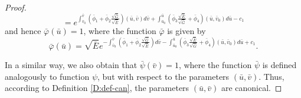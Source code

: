 \documentclass[10pt,a4paper]{amsart}
\newcommand{\ds}{\displaystyle}
\begin{document}
\begin{proof}
	$$
	=e^{\ds\int_{\bar v_0}^{\bar v}\left(\bar \phi_1+\bar \phi_2\frac{\sqrt {\bar G}}{\sqrt {\bar E}}\right)(\bar u,\bar v)d\bar v
		+\int_{\bar u_0}^{\bar u}\left(\bar \phi_3\frac{\sqrt {\bar E}}{\sqrt {\bar G}}+ \bar \phi_4\right)(\bar u,\bar v_0)d\bar u-c_1}
	$$
	and hence $\bar\varphi (\bar u)=1$, where the function $\bar\varphi$ is given by
$$
\ds\bar\varphi (\bar u) = \sqrt{ \bar E} e^{\ds-\int_{\bar{v}_0}^{\bar v}\left(\bar\phi_1+\bar\phi_2\frac{\sqrt{\bar G}}{\sqrt{\bar E}}\right)d\bar v
	-\int_{\bar{u}_0}^{\bar u}\left(\bar\phi_3\frac{\sqrt{\bar E}}{\sqrt{\bar G}}+\bar\phi_4\right)(\bar u,\bar{v}_0)d\bar u+c_1}.
$$

In a  similar way, we also obtain that $\bar\psi(\bar v)=1$, where the function $\bar\psi$ is defined analogously to function $\psi$, but with respect to the parameters $(\bar u,\bar v)$. Thus, according to Definition \ref{D:def-can}, the parameters $(\bar u,\bar v)$ are canonical.
	
\end{proof}
\end{document}

